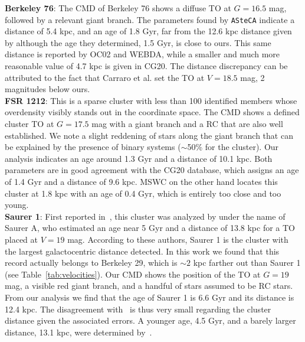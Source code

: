\documentclass{aa}
\begin{document}
\begin{appendix}
  \noindent \textbf{Berkeley 76}: The CMD of Berkeley 76 shows a diffuse TO at $G=16.5$
  mag, followed by a relevant giant branch. The parameters found by
  \texttt{ASteCA} indicate a distance of 5.4 kpc, and an age of 1.8 Gyr, far
  from the 12.6 kpc distance given
  by \cite{Carraro_2013_Five} although the age they determined, 1.5 Gyr, is
  close to ours. This same distance is reported by OC02 and WEBDA, while a
  smaller and much more reasonable value of 4.7 kpc is given in CG20.
  The distance discrepancy can be attributed to the fact that Carraro et al. set
  the TO at $V=18.5$ mag, 2 magnitudes below ours.\\

  \noindent \textbf{FSR 1212}: This is a sparse cluster with less than 100 identified 
  members whose overdensity visibly stands out in the coordinate space. The CMD
  shows a defined cluster TO at $G=17.5$ mag with a giant branch and a RC that
  are also well established. We note a slight reddening of stars along the
  giant branch that can be explained by the presence of binary systems 
  ($\sim$50\% for the cluster).
  Our analysis indicates an age around 1.3 Gyr and a distance of 10.1
  kpc. Both parameters are in good agreement with the CG20 database, which
  assigns an age of 1.4 Gyr and a distance of 9.6 kpc. MSWC on the other hand
  locates this cluster at 1.8 kpc with an age of 0.4 Gyr, which is entirely too
  close and too young.\\

  \noindent \textbf{Saurer 1}: First reported in~\citet[][along with Saurer 3 and Saurer 6]
  {Saurer_1994}, this cluster was analyzed by \cite{Carraro_2003} under
  the name of Saurer A, who estimated an age near 5 Gyr and a distance of 13.8
  kpc for a TO placed at $V=19$ mag. According to these authors, Saurer 1 is the
  cluster with the largest galactocentric distance detected. In this work we
  found that this record actually belongs to Berkeley 29, which is $\sim2$
  kpc farther out than Saurer 1 (see Table~\ref{tab:velocities}).
  Our CMD shows the position of the TO at $G=19$ mag, a visible red giant
  branch, and a handful of stars assumed to be  RC stars. From our analysis we find
  that the age of Saurer 1 is 6.6 Gyr and its distance is 12.4 kpc. The
  disagreement with~\cite{Carraro_2003} is thus very small regarding the
  cluster distance given the associated errors. A younger age, 4.5 Gyr, and
  a barely larger distance, 13.1 kpc, were determined
  by~\cite{Frinchaboy_2006}.\\


\end{appendix}
\end{document}
